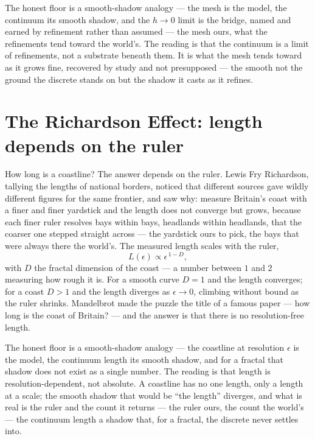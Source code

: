 The honest floor is a smooth-shadow analogy --- the mesh is the model, the continuum its smooth shadow, and the
$h \to 0$ limit is the bridge, named and earned by refinement rather than assumed --- the mesh ours, what the
refinements tend toward the world's. The reading is that the
continuum is a limit of refinements, not a substrate beneath them. It is what the mesh tends toward as it grows
fine, recovered by study and not presupposed --- the smooth not the ground the discrete stands on but the
shadow it casts as it refines.

\section{The Richardson Effect: length depends on the ruler}
\label{se:richardson}

How long is a coastline? The answer depends on the ruler. Lewis Fry Richardson, tallying the lengths of
national borders, noticed that different sources gave wildly different figures for the same frontier, and saw
why: measure Britain's coast with a finer and finer yardstick and the length does not converge but grows,
because each finer ruler resolves bays within bays, headlands within headlands, that the coarser one stepped
straight across --- the yardstick ours to pick, the bays that were always there the world's. The measured
length scales with the ruler,
\begin{equation}
  L(\epsilon) \propto \epsilon^{\,1 - D},
\end{equation}
with $D$ the fractal dimension of the coast --- a number between $1$ and $2$ measuring how rough it is. For a
smooth curve $D = 1$ and the length converges; for a coast $D > 1$ and the length diverges as $\epsilon \to 0$,
climbing without bound as the ruler shrinks. Mandelbrot made the puzzle the title of a famous paper --- how
long is the coast of Britain? --- and the answer is that there is no resolution-free length.

The honest floor is a smooth-shadow analogy --- the coastline at resolution $\epsilon$ is the model, the
continuum length its smooth shadow, and for a fractal that shadow does not exist as a single number. The
reading is that length is resolution-dependent, not absolute. A coastline has no one length, only a length at a
scale; the smooth shadow that would be ``the length'' diverges, and what is real is the ruler and the count it
returns --- the ruler ours, the count the world's --- the continuum length a shadow that, for a fractal, the
discrete never settles into.

